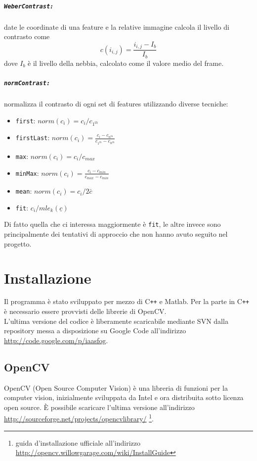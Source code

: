 \documentclass[12pt]{report}
\begin{document}
\paragraph*{\verb_WeberContrast:_} date le coordinate di una feature e la relative immagine calcola il livello di contrasto come $$c\left(i_{i,j}\right)= \frac{i_{i,j}-I_b}{I_b}$$ dove $I_b$ \`e il livello della nebbia, calcolato come il valore medio del frame.

\paragraph*{\verb_normContrast:_} normalizza il contrasto di ogni set di features utilizzando diverse tecniche:
\begin{itemize}
	\item \verb|first|: $ norm\left(c_i\right) = c_i/c_{1^{th}} $
	\item \verb|firstLast|: $ norm\left(c_i\right) = \frac{c_i-c_{n^{th}}}{c_{1^{th}} - c_{n^{th}}} $
	\item \verb|max|: $ norm\left(c_i\right) = c_i/c_{max} $
	\item \verb|minMax|: $ norm\left(c_i\right) = \frac{c_i-c_{min}}{c_{max} - c_{min}} $
	\item \verb|mean|: $ norm(c_i) = c_i/2\bar{c} $
	\item \verb|fit|: $ c_i / mle_{k}(\underline{c}) $
\end{itemize}

\noindent Di fatto quella che ci interessa maggiormente \`e \verb|fit|, le altre invece sono principalmente dei tentativi di approccio che non hanno avuto seguito nel progetto.

\chapter{Installazione}

\noindent Il programma \`e stato sviluppato per mezzo di C\verb|++| e Matlab. Per la parte in C\verb|++| \`e necessario essere provvisti delle librerie di OpenCV.\\
L'ultima versione del codice \`e liberamente scaricabile mediante SVN dalla repository messa a disposizione su Google Code all'indirizzo \url{http://code.google.com/p/iaasfog}.

\section{OpenCV}
OpenCV (Open Source Computer Vision) \`e una libreria di funzioni per la computer vision, inizialmente sviluppata da Intel e ora distribuita sotto licenza open source. \`E possibile scaricare l'ultima versione all'indirizzo \url{http://sourceforge.net/projects/opencvlibrary/} \footnote{guida d'installazione ufficiale all'indirizzo \url{http://opencv.willowgarage.com/wiki/InstallGuide}}.
\end{document}
